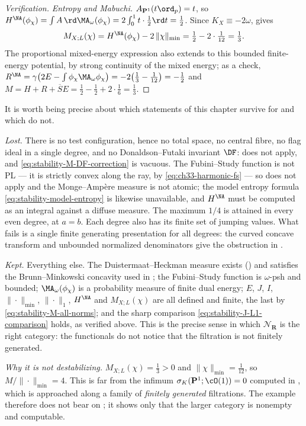 \begin{proof}[Verification]
\emph{Entropy and Mabuchi.}  $A_{\mathbf P^1}(t\ord_p)=t$, so
$H^{\NA}(\phi_\chi)=\int A\,\rd\MA_\omega(\phi_\chi)
=2\int_0^1t\cdot\tfrac12\rd t=\tfrac12$.  Since
$K_X\equiv-2\omega$,  gives
\[
 M_{X;L}(\chi)=H^{\NA}(\phi_\chi)-2\,\|\chi\|_{\min}
 =\tfrac12-2\cdot\tfrac1{12}=\tfrac13 .
\]
The proportional mixed-energy expression also extends to this bounded
finite-energy potential, by strong continuity of the mixed energy; as a check,
$R^{\NA}=\gamma\bigl(2E-\int\phi_\chi\MA_\omega\phi_\chi\bigr)
=-2\bigl(\tfrac13-\tfrac1{12}\bigr)=-\tfrac12$ and
$M=H+R+\overline SE=\tfrac12-\tfrac12+2\cdot\tfrac16=\tfrac13$.
\end{proof}

\begin{remark}
\label{rem:ch50-harmonic-what-changes}
It is worth being precise about which statements of this chapter survive
for  and which do not.

\emph{Lost.}  There is no test configuration, hence no total space, no
central fibre, no flag ideal in a single degree, and no
Donaldson--Futaki invariant $\DF$:  does not apply, and
\eqref{eq:stability-M-DF-correction} is vacuous.  The Fubini--Study
function is not PL --- it is strictly convex along the ray, by
\eqref{eq:ch33-harmonic-fs} --- so  does not
apply and the Monge--Amp\`ere measure is not atomic; the model entropy
formula \eqref{eq:stability-model-entropy} is likewise unavailable, and
$H^{\NA}$ must be computed as an integral against a diffuse measure.
The maximum $1/4$ is attained in every even degree, at $a=b$.
Each degree also has its finite set of jumping values.  What fails is a
single finite generating presentation for all degrees: the curved
concave transform and unbounded normalized denominators give the
obstruction in .

\emph{Kept.}  Everything else.  The Duistermaat--Heckman measure exists
() and satisfies the Brunn--Minkowski
concavity used in ; the Fubini--Study function is
$\omega$-psh and bounded; $\MA_\omega(\phi_\chi)$ is a probability
measure of finite dual energy; $E$, $J$, $I$,
$\|\cdot\|_{\min}$, $\|\cdot\|_1$, $H^{\NA}$ and $M_{X;L}(\chi)$
are all defined and finite, the last by
\eqref{eq:stability-M-all-norms}; and the sharp comparison
\eqref{eq:stability-J-L1-comparison} holds, as verified above.  This is the
precise sense in which $\mathcal N_{\mathbf R}$ is the right category:
the functionals do not notice that the filtration is not finitely
generated.

\emph{Why it is not destabilizing.}  $M_{X;L}(\chi)=\tfrac13>0$ and
$\|\chi\|_{\min}=\tfrac1{12}$, so $M/\|\cdot\|_{\min}=4$.  This is far
from the infimum $\sigma_K(\mathbf P^1;\cO(1))=0$ computed in
, which is approached along a family
of \emph{finitely generated} filtrations.  The example therefore does not
bear on ; it shows only that
the larger category is nonempty and computable.
\end{remark}

